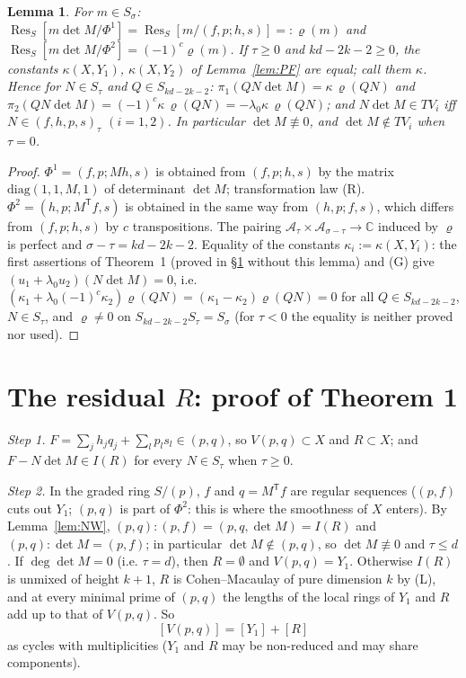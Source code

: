 \documentclass[11pt]{article}
\numberwithin{equation}{section}
\newtheorem{lemma}[theorem]{Lemma}
\theoremstyle{remark}
\newcommand{\CC}{\mathbb{C}}
\newcommand{\cA}{\mathcal{A}}
\newcommand{\Res}{\operatorname{Res}}
\newcommand{\T}{\mathsf{T}}
\newcommand{\lz}{\lambda_0}
\begin{document}
\begin{lemma}\label{lem:det}
For $m\in S_\sigma$: $\Res_S[m\det M/\Phi^1]=\Res_S[m/(f,p;h,s)]=:\varrho(m)$ and
$\Res_S[m\det M/\Phi^2]=(-1)^c\varrho(m)$. If $\tau\ge0$ and $kd-2k-2\ge0$, the constants $\kappa(X,Y_1)$,
$\kappa(X,Y_2)$ of Lemma~\ref{lem:PF} are equal; call them $\kappa$. Hence for $N\in S_\tau$ and
$Q\in S_{kd-2k-2}$: $\pi_1(QN\det M)=\kappa\,\varrho(QN)$ and $\pi_2(QN\det M)=(-1)^c\kappa\,\varrho(QN)=-\lz\kappa\,\varrho(QN)$;
and $N\det M\in TV_i$ iff $N\in(f,h,p,s)_\tau$ $(i=1,2)$. In particular $\det M\not\equiv0$, and
$\det M\notin TV_i$ when $\tau=0$.
\end{lemma}
\begin{proof}
$\Phi^1=(f,p;Mh,s)$ is obtained from $(f,p;h,s)$ by the matrix $\mathrm{diag}(1,1,M,1)$ of determinant
$\det M$; transformation law (R). $\Phi^2=(h,p;M^\T f,s)$ is obtained in the same way from $(h,p;f,s)$, which
differs from $(f,p;h,s)$ by $c$ transpositions. The pairing $\cA_\tau\times\cA_{\sigma-\tau}\to\CC$ induced by
$\varrho$ is perfect and $\sigma-\tau=kd-2k-2$. Equality of the constants $\kappa_i:=\kappa(X,Y_i)$: the first
assertions of Theorem~1 (proved in \S\ref{sec:R} without this lemma) and (G) give
$(u_1+\lz u_2)(N\det M)=0$, i.e. $(\kappa_1+\lz(-1)^c\kappa_2)\varrho(QN)=(\kappa_1-\kappa_2)\varrho(QN)=0$ for all
$Q\in S_{kd-2k-2}$, $N\in S_\tau$, and $\varrho\ne0$ on $S_{kd-2k-2}S_\tau=S_\sigma$ (for $\tau<0$ the equality is
neither proved nor used).
\end{proof}

\section{The residual \texorpdfstring{$R$}{R}: proof of Theorem 1}\label{sec:R}

\emph{Step 1.} $F=\sum_jh_jq_j+\sum_lp_ls_l\in(p,q)$, so $V(p,q)\subset X$ and $R\subset X$; and
$F-N\det M\in I(R)$ for every $N\in S_\tau$ when $\tau\ge0$.

\emph{Step 2.} In the graded ring $S/(p)$, $f$ and $q=M^\T f$ are regular sequences ($(p,f)$ cuts out $Y_1$;
$(p,q)$ is part of $\Phi^2$: this is where the smoothness of $X$ enters). By Lemma~\ref{lem:NW},
$(p,q):(p,f)=(p,q,\det M)=I(R)$ and $(p,q):\det M=(p,f)$; in particular $\det M\notin(p,q)$, so $\det M\not\equiv0$
and $\tau\le d$. If $\deg\det M=0$ (i.e. $\tau=d$), then $R=\emptyset$ and $V(p,q)=Y_1$. Otherwise $I(R)$ is
unmixed of height $k+1$, $R$ is Cohen--Macaulay of pure dimension $k$ by (L), and at every minimal prime of
$(p,q)$ the lengths of the local rings of $Y_1$ and $R$ add up to that of $V(p,q)$. So
\begin{equation}\label{eq:link}
[V(p,q)]=[Y_1]+[R]
\end{equation}
as cycles with multiplicities ($Y_1$ and $R$ may be non-reduced and may share components).
\end{document}
